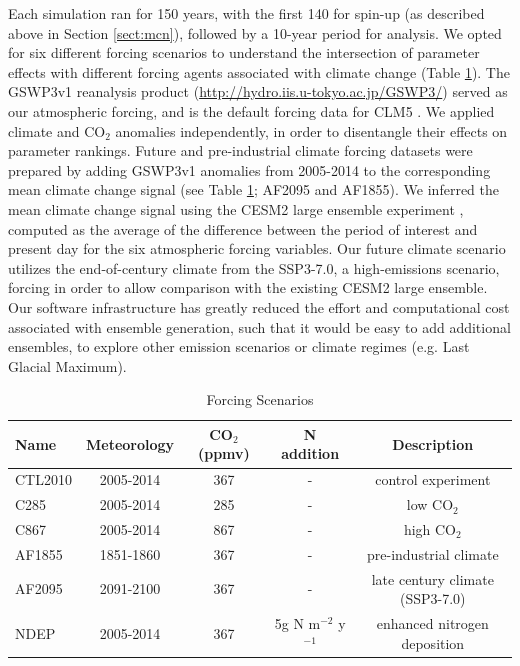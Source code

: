 \documentclass[draft]{agujournal2019}
\begin{document}
Each simulation ran for 150 years, with the first 140 for spin-up (as described above in Section \ref{sect:mcn}), followed by a 10-year period for analysis. We opted for six different forcing scenarios to understand the intersection of parameter effects with different forcing agents associated with climate change (Table \ref{tab:exps}). The GSWP3v1 reanalysis product (\url{http://hydro.iis.u-tokyo.ac.jp/GSWP3/}) served as our atmospheric forcing, and is the default forcing data for CLM5 \cite{lawrence2019}. We applied climate and CO$_2$ anomalies independently, in order to disentangle their effects on parameter rankings. Future and pre-industrial climate forcing datasets were prepared by adding GSWP3v1 anomalies from 2005-2014 to the corresponding mean climate change signal (see Table \ref{tab:exps}; AF2095 and AF1855). We inferred the mean climate change signal using the CESM2 large ensemble experiment \cite{rodgers2021}, computed as the average of the difference between the period of interest and present day for the six atmospheric forcing variables. Our future climate scenario utilizes the end-of-century climate from the SSP3-7.0, a high-emissions scenario, forcing in order to allow comparison with the existing CESM2 large ensemble. Our software infrastructure has greatly reduced the effort and computational cost associated with ensemble generation, such that it would be easy to add additional ensembles, to explore other emission scenarios or climate regimes (e.g. Last Glacial Maximum).  

\label{sect:exps}
 \begin{table}[h]
 \caption{Forcing Scenarios}
 \centering
 \begin{tabular}{l c c c c}
 \hline
  Name  & Meteorology & CO$_2$ (ppmv) & N addition & Description \\
 \hline
   CTL2010  & 2005-2014 & 367 & - & control experiment\\
   C285        & 2005-2014 & 285 & - & low CO$_2$ \\
   C867        & 2005-2014 & 867 & - & high CO$_2$ \\
   AF1855    & 1851-1860 & 367 & - & pre-industrial climate \\
   AF2095    & 2091-2100 & 367 & - & late century climate (SSP3-7.0) \\
   NDEP      & 2005-2014 & 367 & 5g N m$^{-2}$  y$^{-1}$ & enhanced nitrogen deposition \\
 \hline
 \end{tabular}
 \label{tab:exps}
 \end{table}
\end{document}
